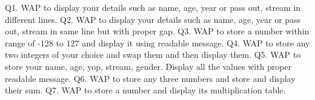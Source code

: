 Q1. WAP to display your details such as name, age, year or pass out, stream
in different lines.
Q2. WAP to display your details such as name, age, year or pass out, stream
in same line but with proper gap.
Q3. WAP to store a number within range of -128 to 127 and display it using readable message.
Q4. WAP to store any two integers of your choice and swap them and then display them.
Q5. WAP to store your name, age, yop, stream, gender. Display all the values with proper
   readable message.
Q6. WAP to store any three numbers and  store and display their sum.
Q7. WAP to store a number and display its multiplication table.